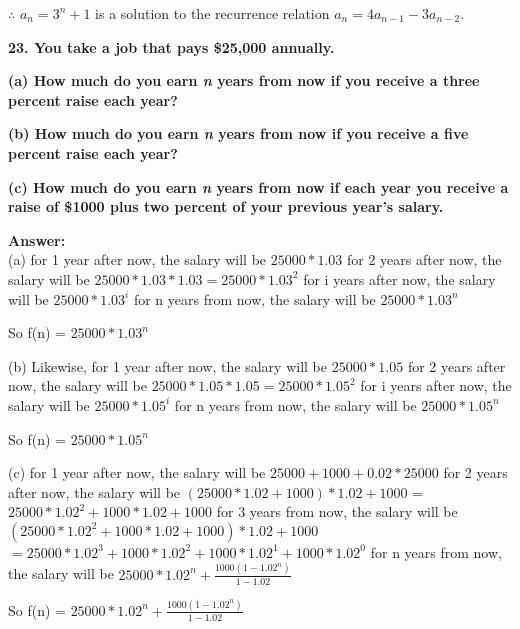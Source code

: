 \documentclass{article}
\begin{document}
\begin{large}
$\therefore$ $a_{n}={3^{n}+1}$ is a solution to the recurrence relation $a_{n}=4a_{n-1}-3a_{n-2}$.


\textbf{23. You take a job that pays \$25,000 annually.}

\textbf{(a) How much do you earn \emph{n} years from now if you receive a three percent raise each year?}

\textbf{(b) How much do you earn \emph{n} years from now if you receive a five percent raise each year? }

\textbf{(c) How much do you earn \emph{n} years from now if each year you receive a raise of \$1000 plus two percent of your previous year's salary.}

\textbf{Answer:} \\

(a) for 1 year after now, the salary will be $25000 * 1.03$
    for 2 years after now, the salary will be $25000 * 1.03 * 1.03 = 25000 * 1.03^2$
    for i years after now, the salary will be $25000 * 1.03^i$
    for n years from now, the salary will be $25000 * 1.03^n$

    So f(n) = $25000 * 1.03^n$

(b) Likewise, 
    for 1 year after now, the salary will be $25000 * 1.05$
    for 2 years after now, the salary will be $25000 * 1.05 * 1.05 = 25000 * 1.05^2$
    for i years after now, the salary will be $25000 * 1.05^i$
    for n years from now, the salary will be $25000 * 1.05^n$

    So f(n) = $25000 * 1.05^n$

(c) for 1 year after now, the salary will be $25000 + 1000 + 0.02 * 25000$
    for 2 years after now, the salary will be $(25000 * 1.02 + 1000) * 1.02 + 1000$
                                             = $25000 * 1.02^2 + 1000 * 1.02 + 1000$
    for 3 years from now, the salary will be $(25000 * 1.02^2 + 1000 * 1.02 + 1000) * 1.02 + 1000$
                                           $ = 25000 * 1.02^3 + 1000 * 1.02^2 + 1000 * 1.02^1 + 1000 * 1.02^0$
    for n years from now, the salary will be $25000 * 1.02^n + \frac {1000 (1 - 1.02^n)}{1 - 1.02}$

    So f(n) = $25000 * 1.02^n + \frac {1000 (1 - 1.02^n)}{1 - 1.02}$

\end{large}
\end{document}
